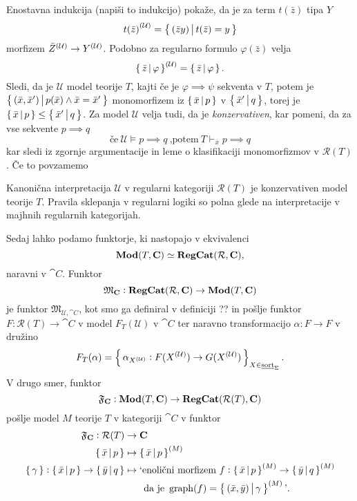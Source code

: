 \documentclass[../kategoricna_logika.tex]{subfiles}
\begin{document}
\noindent
Enostavna indukcija (napiši to indukcijo) pokaže, da je za term $t(\bar{z})$ tipa $Y$
$${t(\bar{z})}^{(\mathcal{U})} = \left\lbrace\,(\bar{z}y)\,\middle|\, t(\bar{z}) = y\,\right\rbrace$$
morfizem ${\bar{Z}}^{(\mathcal{U})} \to {Y}^{(\mathcal{U})}$. Podobno za regularno formulo $\varphi(\bar{z})$ velja 
$${\left\lbrace\,\bar{z}\,\middle|\, \varphi\,\right\rbrace}^{(\mathcal{U})} = \left\lbrace\,\bar{z}\,\middle|\, \varphi\,\right\rbrace.$$
Sledi, da je $\mathcal{U}$ model teorije $T$, kajti če je $\varphi \implies \psi$ sekventa v $T$,
potem je $\left\lbrace\,(\bar{x}, \bar{x}')\,\middle|\, p(\bar{x}) \wedge \bar{x}= \bar{x}'\,\right\rbrace$
monomorfizem iz $\left\lbrace\,\bar{x}\,\middle|\, p\,\right\rbrace$ v $\left\lbrace\,\bar{x}'\,\middle|\, q\,\right\rbrace$,
torej je $\left\lbrace\,\bar{x}\,\middle|\, p\,\right\rbrace \leq \left\lbrace\,\bar{x}'\,\middle|\, q\,\right\rbrace$.
Za model $\mathcal{U}$ velja tudi, da je \emph{konzervativen}, kar pomeni,
da za vse sekvente $p \implies q$
$$\text{če} \ \mathcal{U} \models p \implies q \ \text{,potem} \ T \vdash_{\bar{x}} p \implies q$$
kar sledi iz zgornje argumentacije in leme o klasifikaciji monomorfizmov v $\mathcal{R}(T)$.
Če to povzamemo 
\begin{izrek}
  Kanonična interpretacija $\mathcal{U}$ v regularni kategoriji $\mathcal{R}(T)$ je konzervativen model teorije $T$. Pravila sklepanja v regularni logiki so polna glede na interpretacije v majhnih regularnih kategorijah.
\end{izrek}
Sedaj lahko podamo funktorje, ki nastopajo v ekvivalenci 
$$\mathbf{Mod}(T, {\operatorname{\mathbf{C}}}) \simeq {\operatorname{\mathbf{RegCat}}}(\mathcal{R}, {\operatorname{\mathbf{C}}}),$$
naravni v $\cat{C}$. Funktor 
$$\mathfrak{M}_{{\operatorname{\mathbf{C}}}} : {\operatorname{\mathbf{RegCat}}}(\mathcal{R}, {\operatorname{\mathbf{C}}}) \to \mathbf{Mod}(T, {\operatorname{\mathbf{C}}})$$
je funktor $\mathfrak{M}_{\mathcal{U}, \cat{C}}$, kot smo ga definiral v definiciji ?? in pošlje funktor $F : \mathcal{R}(T) \to \cat{C}$ v model $F_T(\mathcal{U})$ v $\cat{C}$ ter naravno transformacijo $\alpha : F \to F$ v družino
$$F_T(\alpha) = \left\lbrace\,\alpha_{{X}^{(\mathcal{U})}} : F({X}^{(\mathcal{U})}) \to G({X}^{(\mathcal{U})})\,\right\rbrace_{X \in \underline{\mathrm{sort}}_{\Sigma}}.$$
V drugo smer, funktor 
$$\mathfrak{F}_{{\operatorname{\mathbf{C}}}} : \mathbf{Mod}(T, {\operatorname{\mathbf{C}}}) \to {\operatorname{\mathbf{RegCat}}}(\mathcal{R}(T), {\operatorname{\mathbf{C}}})$$
pošlje model $M$ teorije $T$ v kategoriji $\cat{C}$ v funktor
\begin{align*}
  \mathfrak{F}_{{\operatorname{\mathbf{C}}}} : \mathcal{R}(T) &\to {\operatorname{\mathbf{C}}}\\
  \left\lbrace\,\bar{x}\,\middle|\, p\,\right\rbrace &\mapsto \left\lbrace\,\bar{x}\,\middle|\, p\,\right\rbrace^{(M)} \\
  \left\lbrace\,\gamma\,\right\rbrace : \left\lbrace\,\bar{x}\,\middle|\, p\,\right\rbrace \to \left\lbrace\,\bar{y}\,\middle|\, q\,\right\rbrace &\mapsto \text{`enolični morfizem} \ f : \left\lbrace\,\bar{x}\,\middle|\, p\,\right\rbrace^{(M)} \to \left\lbrace\,\bar{y}\,\middle|\, q\,\right\rbrace^{(M)} \\ 
  &\qquad \text{da je} \ \operatorname{graph}(f) = \left\lbrace\,(\bar{x}, \bar{y}) \,\middle|\, \gamma\,\right\rbrace^{(M)} \text{'}.
\end{align*}
\end{document}

